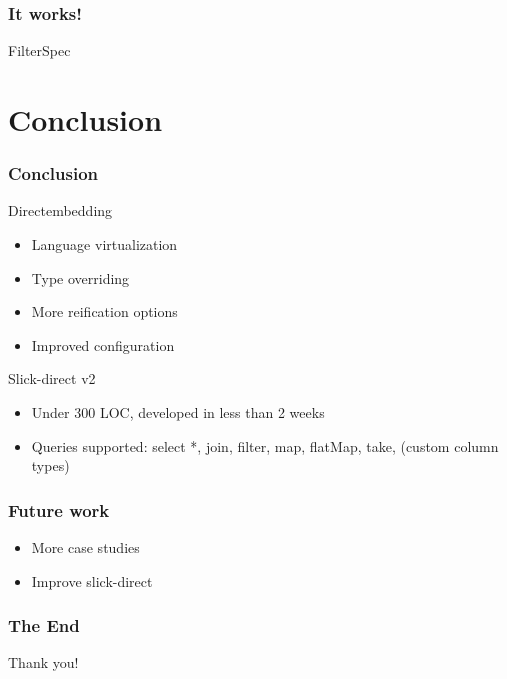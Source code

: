 \documentclass[xcolor=dvipsnames]{beamer}
\theoremstyle{definition}
\begin{document}
\begin{frame}[fragile]
    \frametitle{It works!}
    \begin{block}{FilterSpec}
        
    \end{block}
\end{frame}


\section{Conclusion} %
\label{sec:Conclusion}

\begin{frame}[fragile]
    \frametitle{Conclusion}
    \begin{block}{Directembedding}
        \begin{itemize}
            \item Language virtualization
            \item Type overriding
            \item More reification options
            \item Improved configuration
        \end{itemize}
    \end{block}
    \begin{block}{Slick-direct v2}
        \begin{itemize}
            \item Under 300 LOC, developed in less than 2 weeks
            \item Queries supported: select *, join, filter, map, flatMap, take, (custom column types)
        \end{itemize}
    \end{block}
\end{frame}

\begin{frame}[fragile]
    \frametitle{Future work}
    \begin{itemize}
        \item More case studies
        \item Improve slick-direct
    \end{itemize}
\end{frame}

\begin{frame}[fragile]
    \frametitle{The End}
    \begin{center}
        \Huge
        Thank you!
    \end{center}
\end{frame}

\end{document}
